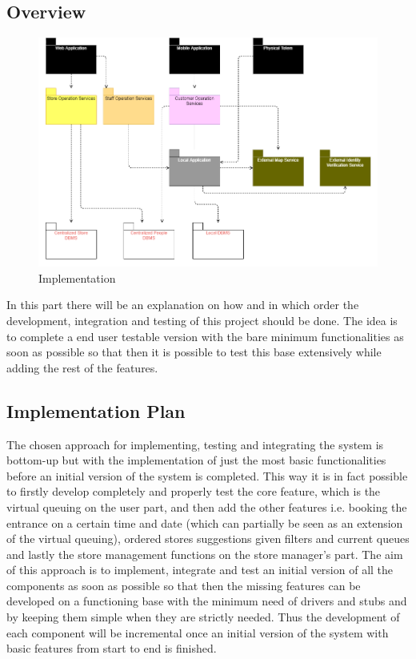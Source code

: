 \subsection{Overview}
\begin{figure}[h!]
	\includegraphics[width=\linewidth]{../Diagrams/IntegrationImplementation/IntegrationOverview.png}
	\caption{Implementation}
	\label{fig:Implementation1}
\end{figure}
In this part there will be an explanation on how and in which order the development, integration and testing of this project should be done. The idea is to complete a end user testable version with the bare minimum functionalities as soon as possible so that then it is possible to test this base extensively while adding the rest of the features.
\subsection{Implementation Plan}
The chosen approach for implementing, testing and integrating the system is bottom-up but with the implementation of just the most basic functionalities before an initial version of the system is completed.
This way it is in fact possible to firstly develop completely and properly test the core feature, which is the virtual queuing on the user part, and then add the other features i.e. booking the entrance on a certain time and date (which can partially be seen as an extension of the virtual queuing), ordered stores suggestions given filters and current queues and lastly the store management functions on the store manager’s part.
The aim of this approach is to implement, integrate and test an initial version of all the components as soon as possible so that then the missing features can be developed on a functioning base with the minimum need of drivers and stubs and by keeping them simple when they are strictly needed.
Thus the development of each component will be incremental once an initial version of the system with basic features from start to end is finished.
\\

